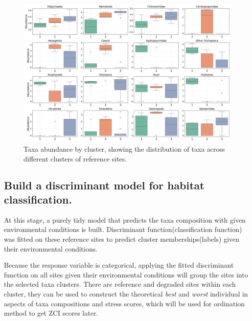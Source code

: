 \begin{figure}[!h]
    \centering
    \includegraphics[width=\textwidth]{../results/preliminary_results/taxa_abundance_by_cluster.png}
    \caption{Taxa abundance by cluster, showing the distribution of taxa across different clusters of reference sites.}
    \label{fig:taxa_abundance_by_cluster}
\end{figure}

\subsection{Build a discriminant model for habitat classification.}

At this stage, a purely tidy model that predicts the taxa composition with given environmental conditions is built.
Discriminant function(classification function) was fitted on these reference sites to 
predict cluster memberships(labels) given their environmental conditions.

Because the response variable is categorical, applying the fitted discriminant function 
on all sites given their environmental conditions will group the sites into 
the selected taxa clusters. 
There are reference and degraded sites within each cluster, they can be used to construct 
the theoretical \textit{best} and \textit{worst} individual in aspects of taxa compositions and stress scores,
which will be used for ordination method to get ZCI scores later.

